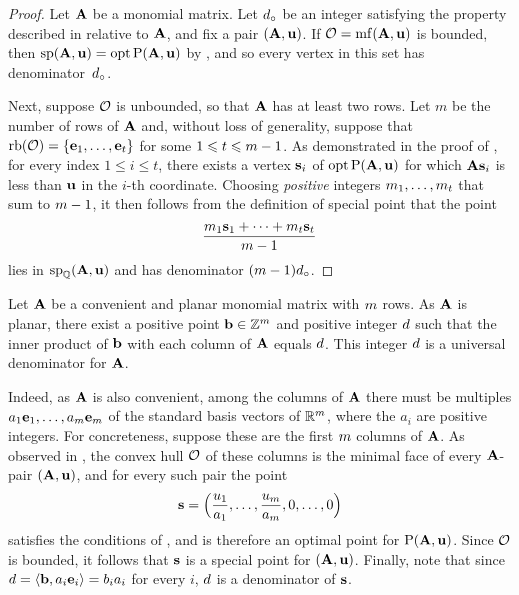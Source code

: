 \documentclass{article}
\begin{document}
\begin{proof}
   Let $\mathbf{A}$ be a monomial matrix.
   Let $d_{\circ}$ be an integer satisfying the property described in  relative to $\mathbf{A}$, and fix a pair $(\mathbf{A}, \mathbf{u})$.
   If $\mathcal{O} = \operatorname{mf}(\mathbf{A}, \mathbf{u})$ is bounded, then $\operatorname{sp}(\mathbf{A}, \mathbf{u}) = \operatorname{opt} \mathrm{P}(\mathbf{A}, \mathbf{u})$ by , and so every vertex in this set has denominator~$d_{\circ}$.

   Next, suppose $\mathcal{O}$ is unbounded, so that $\mathbf{A}$ has at least two rows.
   Let $m$ be the number of rows of $\mathbf{A}$ and, without loss of generality, suppose that $\operatorname{rb}(\mathcal{O}) = \{ \mathbf{e}_1, \ldots, \mathbf{e}_t \}$ for some $1 \leqslant t \leqslant m-1$.
   As demonstrated in the  proof of , for every index  $1 \leq i \leq t$, there exists a vertex $\mathbf{s}_i$ of $\operatorname{opt} \mathrm{P}(\mathbf{A}, \mathbf{u})$ for which $\mathbf{A} \mathbf{s}_i$ is less than $\mathbf{u}$ in the $i$-th coordinate.
   Choosing \emph{positive} integers $m_1, \ldots, m_t$ that sum to $m-1$, it then follows from the definition of special point that the point
   \[ \frac{ m_1 \mathbf{s}_1 + \cdots + m_t  \mathbf{s}_t}{m-1}  \]
   lies in $\operatorname{sp}_{\mathbb{Q}}(\mathbf{A}, \mathbf{u})$ and has denominator $(m-1)d_{\circ}$.
\end{proof}

\begin{example}
   \label{ex: convenient planar case 2}
   Let $\mathbf{A}$ be a convenient and planar monomial matrix with $m$ rows.
   As $\mathbf{A}$ is planar, there exist a positive point $\mathbf{b} \in \mathbb{Z}^m$ and positive integer $d$ such that the inner product of $\mathbf{b}$ with each column of $\mathbf{A}$ equals $d$.
   This integer $d$ is a universal denominator for $\mathbf{A}$.

   Indeed, as $\mathbf{A}$ is also convenient, among the columns of $\mathbf{A}$ there must be multiples $a_1\mathbf{e}_1,\ldots,a_m\mathbf{e}_m$ of the standard basis vectors of $\mathbb{R}^m$, where the $a_i$ are positive integers.
   For concreteness, suppose these are the first $m$ columns of $\mathbf{A}$.
   As observed in , the convex hull $\mathcal{O}$ of these columns is the minimal face of every $\mathbf{A}$-pair $(\mathbf{A},\mathbf{u})$, and for every such pair the point
   \[\mathbf{s} = \Big(\frac{u_1}{a_1},\ldots,\frac{u_m}{a_m},0,\ldots,0\Big)\]
   satisfies the conditions of , and is therefore an optimal point for $\mathrm{P}(\mathbf{A},\mathbf{u})$.
   Since $\mathcal{O}$ is bounded, it follows that $\mathbf{s}$ is a special point for $(\mathbf{A},\mathbf{u})$.
   Finally, note that since $d = \langle \mathbf{b}, a_i\mathbf{e}_i \rangle = b_ia_i$ for every $i$, $d$ is a denominator of $\mathbf{s}$.
\end{example}
\end{document}
